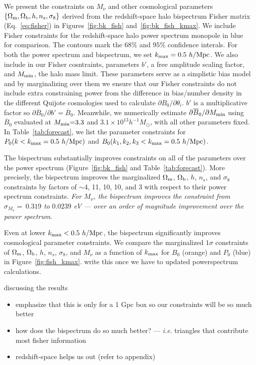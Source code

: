 \documentclass[12pt, letterpaper, preprint]{aastex62}
\newcommand{\Om}{\Omega_{\rm m}}
\newcommand{\Ob}{\Omega_{\rm b}}
\newcommand{\smnu}{M_\nu}
\newcommand{\sig}{\sigma_8}
\newcommand{\bitem}{\begin{itemize}}
\newcommand{\eitem}{\end{itemize}}
\newcommand{\ch}[1]{{\color{orange}{\bf CH:} #1}}
\begin{document}
We present the constraints on $\smnu$ and other cosmological parameters 
$\{\Om, \Ob, h, n_s, \sig\}$ derived from the redshift-space halo bispectrum 
Fisher matrix (Eq.~\ref{eq:fisher}) in Figures~\ref{fig:bk_fish} and~\ref{fig:bk_fish_kmax}. 
We include Fisher constraints for the redshift-space halo power spectrum 
monopole in blue for comparison. The contours mark the $68\%$ and $95\%$ 
confidence interals. For both the power spectrum and bispectrum, we set 
$k_{\rm max} = 0.5~h/{\rm Mpc}$. We also include in our Fisher cosntraints, 
parameters $b'$, a free amplitude scaling factor, and $M_{\rm min}$, the halo 
mass limit. These parameters serve as a simplistic bias model and by marginalizing 
over them we ensure that our Fisher constraints do not include extra constraining 
power from the difference in bias/number density in the different Quijote 
cosmologies used to calculate $\partial \overline{B}_0/\partial \theta_i$. $b'$ is a 
multiplicative factor so $\partial \overline{B}_0/\partial b' = \overline{B}_0$.
Meanwhile, we numerically estimate $\partial \overline{B}_0/\partial M_{\rm min}$ 
using $\overline{B}_0$ evaluated at $M_{\rm min}{=}3.3$ and 
$3.1\times10^{13}h^{-1}M_\odot$, with all other parameters fixed. In Table~\ref{tab:forecast}, we list the 
parameter constraints for $P_0(k < k_{\rm max}=0.5~h/{\rm Mpc})$ and
$B_0(k_1, k_2, k_3 < k_{\rm max}=0.5~h/{\rm Mpc})$.

The bispectrum substantially improves constraints on all of the parameters 
over the power spectrum (Figure~\ref{fig:bk_fish} and Table~\ref{tab:forecast}). 
More precisely, the bispectrum improves the marginalized $\Om$, $\Ob$, $h$, 
$n_s$, and $\sig$ constraints by factors of $\sim$4, 11, 10, 10, and 3 with 
respect to their power spectrum constraints. {\em For $\smnu$, the bispectrum 
improves the constraint from $\sigma_{\smnu}{=}~0.319$ to $0.0239$ eV --- over 
an order of magnitude improvement over the power spectrum}.

Even at lower $k_{\rm max} < 0.5~h/{\rm Mpc}$, the bispectrum significantly 
improves cosmological parameter constraints. We compare the marginalized 
$1\sigma$ constraints of $\Om$, $\Ob$, $h$, $n_s$, $\sig$, and $\smnu$ as 
a function of $k_{\rm max}$ for $B_0$ (orange) and $P_0$ (blue) in Figure~\ref{fig:fish_kmax}. 
\ch{write this once we have to updated powerspectrum calculations}. 

discussing the results  
\bitem 
\item emphasize that this is only for a 1 Gpc box so our constraints will be so much better
\item how does the bispectrum do so much better? --- \emph{i.e.} triangles that contribute 
    most fisher information
\item redshift-space helps us out (refer to appendix) 
\eitem 
\end{document}
